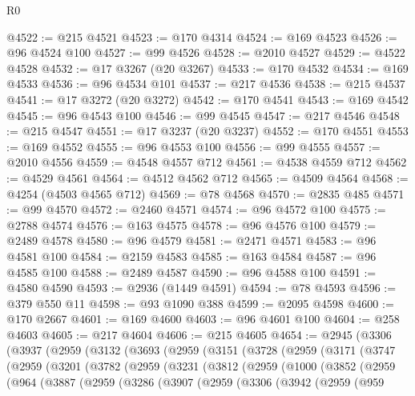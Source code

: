 \begin{lexlean}{R0}
\begin{coremodule}
@4522 := @215 @4521
@4523 := @170 @4314
@4524 := @169 @4523
@4526 := @96 @4524 @100
@4527 := @99 @4526
@4528 := @2010 @4527
@4529 := @4522 @4528
@4532 := @17 @3267 (@20 @3267)
@4533 := @170 @4532
@4534 := @169 @4533
@4536 := @96 @4534 @101
@4537 := @217 @4536
@4538 := @215 @4537
@4541 := @17 @3272 (@20 @3272)
@4542 := @170 @4541
@4543 := @169 @4542
@4545 := @96 @4543 @100
@4546 := @99 @4545
@4547 := @217 @4546
@4548 := @215 @4547
@4551 := @17 @3237 (@20 @3237)
@4552 := @170 @4551
@4553 := @169 @4552
@4555 := @96 @4553 @100
@4556 := @99 @4555
@4557 := @2010 @4556
@4559 := @4548 @4557 @712
@4561 := @4538 @4559 @712
@4562 := @4529 @4561
@4564 := @4512 @4562 @712
@4565 := @4509 @4564
@4568 := @4254 (@4503 @4565 @712)
@4569 := @78 @4568
@4570 := @2835 @485
@4571 := @99 @4570
@4572 := @2460 @4571
@4574 := @96 @4572 @100
@4575 := @2788 @4574
@4576 := @163 @4575
@4578 := @96 @4576 @100
@4579 := @2489 @4578
@4580 := @96 @4579
@4581 := @2471 @4571
@4583 := @96 @4581 @100
@4584 := @2159 @4583
@4585 := @163 @4584
@4587 := @96 @4585 @100
@4588 := @2489 @4587
@4590 := @96 @4588 @100
@4591 := @4580 @4590
@4593 := @2936 (@1449 @4591)
@4594 := @78 @4593
@4596 := @379 @550 @11
@4598 := @93 @1090 @388
@4599 := @2095 @4598
@4600 := @170 @2667
@4601 := @169 @4600
@4603 := @96 @4601 @100
@4604 := @258 @4603
@4605 := @217 @4604
@4606 := @215 @4605
@4654 := @2945
    (@3306
      (@3937
        (@2959
          (@3132
            (@3693
              (@2959
                (@3151
                  (@3728
                    (@2959
                      (@3171
                        (@3747
                          (@2959
                            (@3201
                              (@3782
                                (@2959
                                  (@3231
                                    (@3812
                                      (@2959
                                        (@1000
                                          (@3852
                                            (@2959
                                              (@964
                                                (@3887
                                                  (@2959
                                                    (@3286
                                                      (@3907
                                                        (@2959
                                                          (@3306
                                                            (@3942
                                                              (@2959
                                                                (@959

\end{coremodule}
\end{lexlean}
